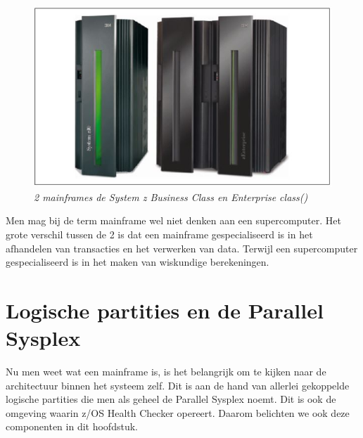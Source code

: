 \begin{figure}[h]
	\centering
	\includegraphics{img/mainframe}
	\caption[Mainframe]{{\small \textit{2 mainframes de System z Business Class en Enterprise class(\cite{Ebbers2011})}}}
	\label{fig:mainframe}
\end{figure}

Men mag bij de term mainframe wel niet denken aan een supercomputer. Het grote verschil tussen de 2 is dat een mainframe gespecialiseerd is in het afhandelen van transacties en het verwerken van data. Terwijl een supercomputer gespecialiseerd is in het maken van wiskundige berekeningen.

\section{Logische partities en de Parallel Sysplex}
\label{sec:Logische partities en de Parallel Sysplex}

Nu men weet wat een mainframe is, is het belangrijk om te kijken naar de architectuur binnen het systeem zelf. Dit is aan de hand van allerlei gekoppelde logische partities die men als geheel de Parallel Sysplex noemt. Dit is ook de omgeving waarin z/OS Health Checker opereert. Daarom belichten we ook deze componenten in dit hoofdstuk.

